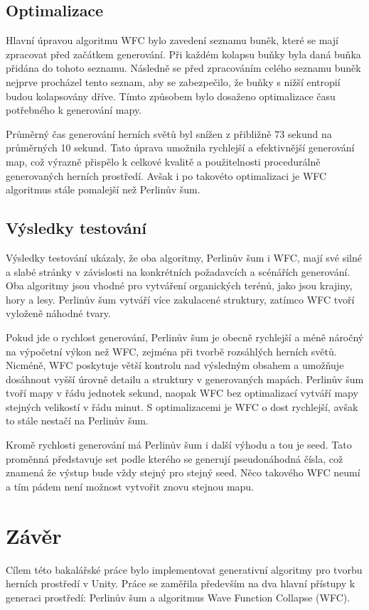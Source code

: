 \section{Optimalizace}
Hlavní úpravou algoritmu WFC bylo zavedení seznamu buněk, které se mají zpracovat před začátkem generování. Při každém kolapsu buňky byla daná buňka přidána do tohoto seznamu. Následně se před zpracováním celého seznamu buněk nejprve procházel tento seznam, aby se zabezpečilo, že buňky s nižší entropií budou kolapsovány dříve. Tímto způsobem bylo dosaženo optimalizace času potřebného k generování mapy.

Průměrný čas generování herních světů byl snížen z přibližně 73 sekund na průměrných 10 sekund. Tato úprava umožnila rychlejší a efektivnější generování map, což výrazně přispělo k celkové kvalitě a použitelnosti procedurálně generovaných herních prostředí. Avšak i po takovéto optimalizaci je WFC algoritmus stále pomalejší než Perlinův šum.

\section{Výsledky testování}
Výsledky testování ukázaly, že oba algoritmy, Perlinův šum i WFC, mají své silné a slabé stránky v závislosti na konkrétních požadavcích a scénářích generování. Oba algoritmy jsou vhodné pro vytváření organických terénů, jako jsou krajiny, hory a lesy. Perlinův šum vytváří více zakulacené struktury, zatímco WFC tvoří vyloženě náhodné tvary.

Pokud jde o rychlost generování, Perlinův šum je obecně rychlejší a méně náročný na výpočetní výkon než WFC, zejména při tvorbě rozsáhlých herních světů. Nicméně, WFC poskytuje větší kontrolu nad výsledným obsahem a umožňuje dosáhnout vyšší úrovně detailu a struktury v generovaných mapách. Perlinův šum tvoří mapy v řádu jednotek sekund, naopak WFC bez optimalizací vytváří mapy stejných velikostí v řádu minut. S optimalizacemi je WFC o dost rychlejší, avšak to stále nestačí na Perlinův šum.

Kromě rychlosti generování má Perlinův šum i další výhodu a tou je seed. Tato proměnná představuje set podle kterého se generují pseudonáhodná čísla, což znamená že výstup bude vždy stejný pro stejný seed. Něco takového WFC neumí a tím pádem není možnost vytvořit znovu stejnou mapu.

\chapter{Závěr}
Cílem této bakalářské práce bylo implementovat generativní algoritmy pro tvorbu herních prostředí v Unity. Práce se zaměřila především na dva hlavní přístupy k generaci prostředí: Perlinův šum a algoritmus Wave Function Collapse (WFC).

